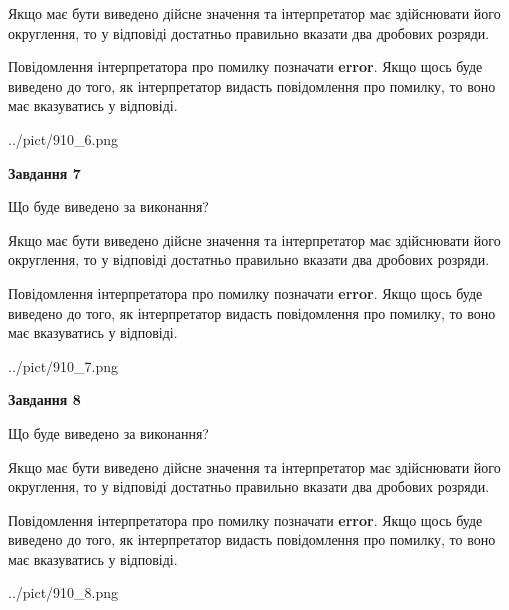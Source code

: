 \documentclass[12pt, ukrainian]{article}
\begin{document}
{\begin {Large}
Якщо має бути виведено дійсне значення та інтерпретатор має здійснювати його округлення, 
то у відповіді достатньо правильно вказати два дробових розряди.

Повідомлення інтерпретатора про помилку позначати \textbf{error}.
Якщо щось буде виведено до того, як інтерпретатор видасть повідомлення про помилку, 
то воно має вказуватись у відповіді. \par

\begin{center}
	{../pict/910_6.png}
\end{center}
\newpage

{\begin {center}\textbf{Завдання 7}\end {center}}\par
Що буде виведено за виконання? \par

Якщо має бути виведено дійсне значення та інтерпретатор має здійснювати його округлення, 
то у відповіді достатньо правильно вказати два дробових розряди.

Повідомлення інтерпретатора про помилку позначати \textbf{error}.
Якщо щось буде виведено до того, як інтерпретатор видасть повідомлення про помилку, 
то воно має вказуватись у відповіді. \par

\begin{center}
	{../pict/910_7.png}
\end{center}
\newpage

{\begin {center}\textbf{Завдання 8}\end {center}}\par
Що буде виведено за виконання? \par

Якщо має бути виведено дійсне значення та інтерпретатор має здійснювати його округлення, 
то у відповіді достатньо правильно вказати два дробових розряди.

Повідомлення інтерпретатора про помилку позначати \textbf{error}.
Якщо щось буде виведено до того, як інтерпретатор видасть повідомлення про помилку, 
то воно має вказуватись у відповіді. \par

\begin{center}
	{../pict/910_8.png}
\end{center}
\newpage


\end{Large}}
\end{document}
